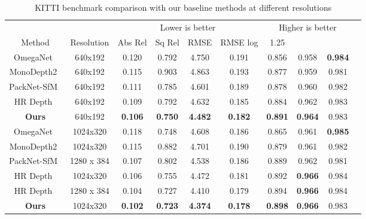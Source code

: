 \documentclass{bmvc2k}
\begin{document}
\begin{table}[!htbp]
\begin{center}
\begin{adjustbox}{max width=\textwidth}
\begin{tabular}{cccccccccc}
\hline
\toprule
& &\multicolumn{4}{c}{Lower is better} &\multicolumn{3}{c}{Higher is better} \\
\cmidrule(r){3-6}\cmidrule(l){7-9}
Method   & Resolution  &Abs Rel   &Sq Rel  &RMSE  &RMSE log  &  1.25  &      &   \\
\bottomrule
\hline
 OmegaNet~\cite{tosi2020distilled}	& 640x192 &0.120	&0.792	&4.750	&0.191	&0.856	&0.958	&\textbf{0.984} \\
 MonoDepth2~\cite{godard2019digging} & 640x192   &0.115	&0.903	&4.863 	&0.193	&0.877	&0.959	&0.981  \\
 PackNet-SfM~\cite{guizilini20203d} &640x192  &0.111	&0.785	&4.601	&0.189	&0.878	&0.960	&0.982 \\
 HR Depth~\cite{lyu2020hr} & 640x192  &0.109	&0.792	&4.632	&0.185	&0.884	&0.962	&0.983 \\
 \textbf{Ours} & 640x192  &\textbf{0.106} 	&\textbf{0.750} 	&\textbf{4.482}	& \textbf{0.182}
 &\textbf{0.891}	&\textbf{0.964} 	&0.983  \\
 \midrule
 OmegaNet~\cite{tosi2020distilled}	 & 1024x320 &0.118	&0.748	&4.608	&0.186	&0.865	&0.961	&\textbf{0.985} \\
 MonoDepth2~\cite{godard2019digging}  & 1024x320 &0.115 &0.882 &4.701 &0.190 &0.879 &0.961 &0.982  \\
  PackNet-SfM~\cite{guizilini20203d} &1280 x 384  &0.107 &0.802 &4.538 &0.186 &0.889 &0.962 &0.981 \\
  HR Depth~\cite{lyu2020hr} & 1024x320   &0.106	&0.755	&4.472	&0.181	&0.892	&\textbf{0.966}	&0.984 \\
   HR Depth~\cite{lyu2020hr} &1280 x 384  &0.104 &0.727 &4.410 &0.179 &0.894 &\textbf{0.966} &0.984 \\

 \textbf{Ours} & 1024x320  &\textbf{0.102} &  \textbf{0.723} &  \textbf{4.374} &  \textbf{0.178} &  \textbf{0.898} &  \textbf{0.966} &  0.983 \\
\bottomrule
\hline
\end{tabular}
\end{adjustbox}
\end{center}
\caption{KITTI benchmark comparison with our baseline methods at different resolutions} \label{tab inp_res}
\end{table}
\end{document}
